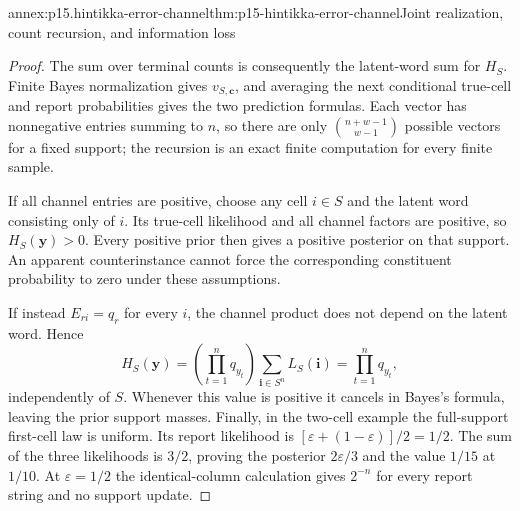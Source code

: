 \begin{annexitem}{annex:p15.hintikka-error-channel}{thm:p15-hintikka-error-channel}{Joint realization, count recursion, and information loss}
\begin{proof}
The sum over terminal counts is consequently the latent-word sum for
\(H_S\). Finite Bayes normalization gives \(v_{S,\boldsymbol c}\),
and averaging the next conditional true-cell and report probabilities
gives the two prediction formulas. Each vector has nonnegative entries
summing to \(n\), so there are only
\(\binom{n+w-1}{w-1}\) possible vectors for a fixed support; the
recursion is an exact finite computation for every finite sample.

If all channel entries are positive, choose any cell \(i\in S\)
and the latent word consisting only of \(i\). Its true-cell likelihood
and all channel factors are positive, so \(H_S(\boldsymbol y)>0\).
Every positive prior then gives a positive posterior on that support.
An apparent counterinstance cannot force the corresponding constituent
probability to zero under these assumptions.

If instead \(E_{ri}=q_r\) for every \(i\), the channel product
does not depend on the latent word. Hence
\[
 H_S(\boldsymbol y)
   =\left(\prod_{t=1}^n q_{y_t}\right)
      \sum_{\boldsymbol i\in S^n}L_S(\boldsymbol i)
   =\prod_{t=1}^n q_{y_t},
\]
independently of \(S\). Whenever this value is positive it cancels
in Bayes's formula, leaving the prior support masses. Finally, in the
two-cell example the full-support first-cell law is uniform. Its report
likelihood is \([\varepsilon+(1-\varepsilon)]/2=1/2\).
The sum of the three likelihoods is \(3/2\), proving the posterior
\(2\varepsilon/3\) and the value \(1/15\) at \(1/10\).
At \(\varepsilon=1/2\) the identical-column calculation gives
\(2^{-n}\) for every report string and no support update.
\end{proof}
\end{annexitem}

